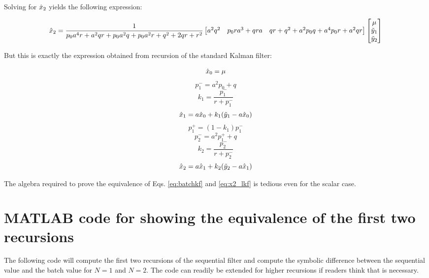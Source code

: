 Solving for $\hat{x}_2$ yields the following expression:

\begin{equation}
\hat{x}_2 = \frac{1}{p_0a^4r + a^2qr + p_0a^2q + p_0a^2r + q^2 + 2qr + r^2} \begin{bmatrix}
a^2q^2 & 
p_0ra^3 + qra & 
qr + q^2 + a^2p_0q + a^4p_0r + a^2qr
\end{bmatrix}\begin{bmatrix}
\mu \\ \tilde{y}_1 \\ \tilde{y}_2
\end{bmatrix}
\label{eq:batchkf}
\end{equation}

But this is exactly the expression obtained from recursion of the standard Kalman filter:

\begin{equation}
\hat{x}_0 = \mu
\end{equation}
\begin{equation}
p_1^{-} = a^2 p_0 + q
\end{equation}
\begin{equation}
k_1 = \frac{p_1^{-}}{r+p_1^{-}}
\end{equation}
\begin{equation}
\hat{x}_1 = a\hat{x}_0 + k_1(\tilde{y}_1-a\hat{x}_0)
\end{equation}
\begin{equation}
p_1^{+} = (1-k_1)p_1^{-}
\end{equation}
\begin{equation}
p_2^{-} = a^2 p_1^{+} + q
\end{equation}
\begin{equation}
k_2 = \frac{p_2^{-}}{r+p_2^{-}}
\end{equation}
\begin{equation}
\hat{x}_2 = a\hat{x}_1 + k_2(\tilde{y}_2 - a\hat{x}_1)
\label{eq:x2_lkf}
\end{equation}

The algebra required to prove the equivalence of Eqs. \ref{eq:batchkf} and \ref{eq:x2_lkf} is tedious even for the scalar case.

\section{MATLAB code for showing the equivalence of the first two recursions}

The following code will compute the first two recursions of the sequential filter and compute the symbolic difference between the sequential value and the batch value for $N = 1$ and $N = 2$.
The code can readily be extended for higher recursions if readers think that is necessary.


